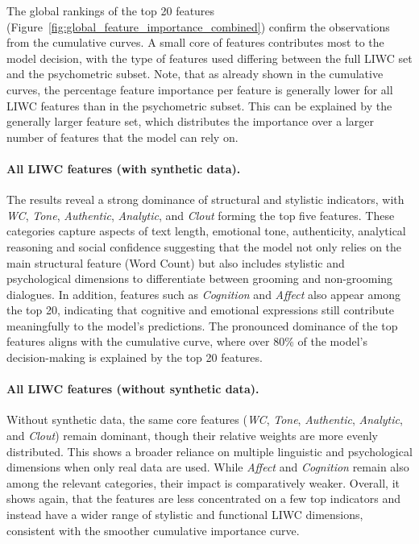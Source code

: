 The global rankings of the top 20 features (Figure~\ref{fig:global_feature_importance_combined}) confirm the observations from the cumulative curves. A small core of features contributes most to the model decision, with the type of features used differing between the full LIWC set and the psychometric subset. Note, that as already shown in the cumulative curves, the percentage feature importance per feature is generally lower for all LIWC features than in the psychometric subset. This can be explained by the generally larger feature set, which distributes the importance over a larger number of features that the model can rely on.

\paragraph{All LIWC features (with synthetic data).}
The results reveal a strong dominance of structural and stylistic indicators, with \textit{WC}, \textit{Tone}, \textit{Authentic}, \textit{Analytic}, and \textit{Clout} forming the top five features. These categories capture aspects of text length, emotional tone, authenticity, analytical reasoning and social confidence suggesting that the model not only relies on the main structural feature (Word Count) but also includes stylistic and psychological dimensions to differentiate between grooming and non-grooming dialogues. In addition, features such as \textit{Cognition} and \textit{Affect} also appear among the top 20, indicating that cognitive and emotional expressions still contribute meaningfully to the model’s predictions. The pronounced dominance of the top features aligns with the cumulative curve, where over 80\% of the model’s decision-making is explained by the top 20 features.

\paragraph{All LIWC features (without synthetic data).}
Without synthetic data, the same core features (\textit{WC}, \textit{Tone}, \textit{Authentic}, \textit{Analytic}, and \textit{Clout}) remain dominant, though their relative weights are more evenly distributed. This shows a broader reliance on multiple linguistic and psychological dimensions when only real data are used. While \textit{Affect} and \textit{Cognition} remain also among the relevant categories, their impact is comparatively weaker. Overall, it shows again, that the features are less concentrated on a few top indicators and instead have a wider range of stylistic and functional LIWC dimensions, consistent with the smoother cumulative importance curve.


